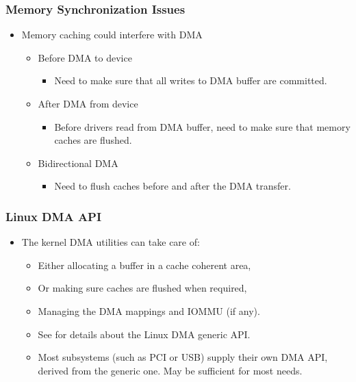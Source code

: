 \begin{frame}
  \frametitle{Memory Synchronization Issues}
  \begin{itemize}
  \item Memory caching could interfere with DMA
    \begin{itemize}
    \item Before DMA to device
      \begin{itemize}
      \item Need to make sure that all writes to DMA buffer are
        committed.
      \end{itemize}
    \item After DMA from device
      \begin{itemize}
      \item Before drivers read from DMA buffer, need to make sure
        that memory caches are flushed.
      \end{itemize}
    \item Bidirectional DMA
      \begin{itemize}
      \item Need to flush caches before and after the DMA transfer.
      \end{itemize}
    \end{itemize}
  \end{itemize}
\end{frame}

\begin{frame}
  \frametitle{Linux DMA API}
  \begin{itemize}
  \item The kernel DMA utilities can take care of:
    \begin{itemize}
    \item Either allocating a buffer in a cache coherent area,
    \item Or making sure caches are flushed when required,
    \item Managing the DMA mappings and IOMMU (if any).
    \item See  for details about the
      Linux DMA generic API.
    \item Most subsystems (such as PCI or USB) supply their own DMA
      API, derived from the generic one. May be sufficient for most
      needs.
    \end{itemize}
  \end{itemize}
\end{frame}

